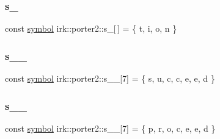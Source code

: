 \subsubsection{\texorpdfstring{s\+\_}{s\_9}}
{\footnotesize\ttfamily const \mbox{\hyperlink{namespaceirk_1_1porter2_afd04c4eb58a1dabcf8f3ab2d7e9f9ed5}{symbol}} irk\+::porter2\+::s\+\_\mbox{[}$\,$\mbox{]} = \{ \textquotesingle{}t\textquotesingle{}, \textquotesingle{}i\textquotesingle{}, \textquotesingle{}o\textquotesingle{}, \textquotesingle{}n\textquotesingle{} \}\hspace{0.3cm}{\ttfamily [static]}}

\mbox{\label{namespaceirk_1_1porter2_abc7eb2cc1e44236d34d4df82a63ae9b8}} 
\subsubsection{\texorpdfstring{s\+\_\+\_}{s\_9\_0}}
{\footnotesize\ttfamily const \mbox{\hyperlink{namespaceirk_1_1porter2_afd04c4eb58a1dabcf8f3ab2d7e9f9ed5}{symbol}} irk\+::porter2\+::s\+\_\+\_\mbox{[}7\mbox{]} = \{ \textquotesingle{}s\textquotesingle{}, \textquotesingle{}u\textquotesingle{}, \textquotesingle{}c\textquotesingle{}, \textquotesingle{}c\textquotesingle{}, \textquotesingle{}e\textquotesingle{}, \textquotesingle{}e\textquotesingle{}, \textquotesingle{}d\textquotesingle{} \}\hspace{0.3cm}{\ttfamily [static]}}

\mbox{\label{namespaceirk_1_1porter2_a9181c7bd92b52358dbd82932858d4859}} 
\subsubsection{\texorpdfstring{s\+\_\+\_}{s\_9\_1}}
{\footnotesize\ttfamily const \mbox{\hyperlink{namespaceirk_1_1porter2_afd04c4eb58a1dabcf8f3ab2d7e9f9ed5}{symbol}} irk\+::porter2\+::s\+\_\+\_\mbox{[}7\mbox{]} = \{ \textquotesingle{}p\textquotesingle{}, \textquotesingle{}r\textquotesingle{}, \textquotesingle{}o\textquotesingle{}, \textquotesingle{}c\textquotesingle{}, \textquotesingle{}e\textquotesingle{}, \textquotesingle{}e\textquotesingle{}, \textquotesingle{}d\textquotesingle{} \}\hspace{0.3cm}{\ttfamily [static]}}

